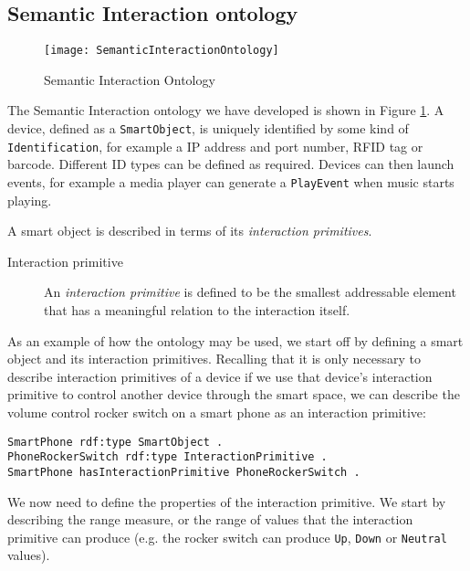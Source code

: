 \subsection{Semantic Interaction ontology}
\label{sectionSemanticInteractionOntology}

\begin{figure}
\centering
\texttt{[image: SemanticInteractionOntology]}
\caption{Semantic Interaction Ontology}
\label{semanticInteractionOntology}
\end{figure} 

The Semantic Interaction ontology we have developed is shown in Figure \ref{semanticInteractionOntology}.  A device, defined as a \texttt{SmartObject}, is uniquely identified by some kind of \texttt{Identification}, for example a IP address and port number, \ac{RFID} tag or barcode.  Different ID types can be defined as required. Devices can then launch events, for example a media player can generate a \texttt{PlayEvent} when music starts playing.


A smart object is described in terms of its \emph{interaction primitives}. 

\begin{description}
	\item [Interaction primitive]An \emph{interaction primitive} is defined to be the smallest addressable element that has a meaningful relation to the interaction itself. 
\end{description}

As an example of how the ontology may be used, we start off by defining a smart object and its interaction primitives. Recalling that it is only necessary to describe interaction primitives of a device if we use that device's interaction primitive to control another device through the smart space, we can describe the volume control rocker switch on a smart phone as an interaction primitive:

\begin{verbatim}
SmartPhone rdf:type SmartObject .
PhoneRockerSwitch rdf:type InteractionPrimitive .
SmartPhone hasInteractionPrimitive PhoneRockerSwitch .
\end{verbatim}

We now need to define the properties of the interaction primitive. We start by describing the range measure, or the range of values that the interaction primitive can produce (e.g. the rocker switch can produce \texttt{Up}, \texttt{Down} or \texttt{Neutral} values).

